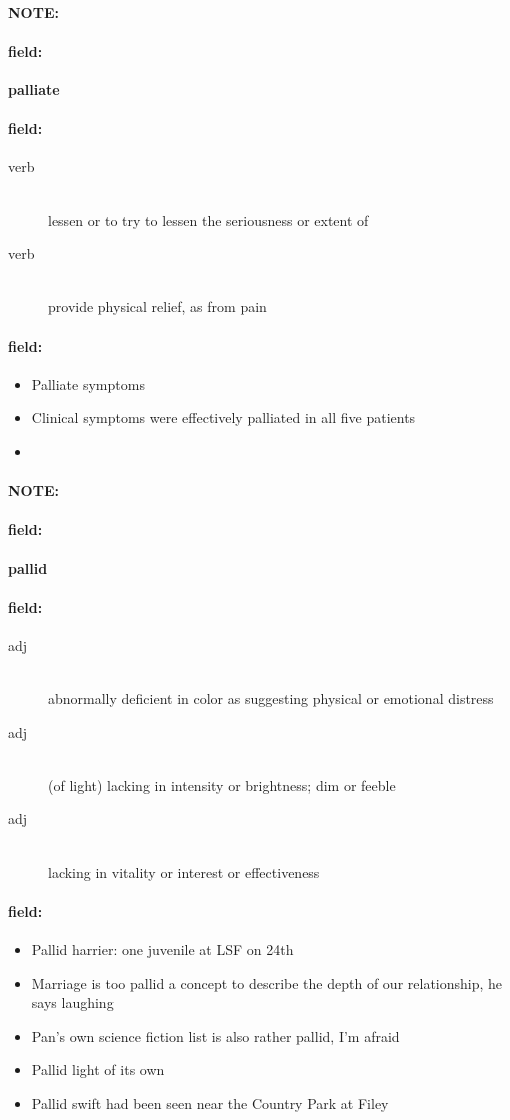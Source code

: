 \documentclass[12pt]{article}
\newenvironment{note}{\paragraph{NOTE:}}{}
\newenvironment{field}{\paragraph{field:}}{}
\begin{document}
\begin{note}
\begin{field}
\textbf{\large palliate}
\end{field}


\begin{field}
\begin{description}
\item[verb] \hfill \\ 
lessen or to try to lessen the seriousness or extent of

\item[verb] \hfill \\ 
provide physical relief, as from pain

\end{description}
\end{field}

\begin{field}
\begin{itemize}
\item Palliate symptoms
\item Clinical symptoms were effectively palliated in all five patients
\item 
\end{itemize}
\end{field}
\end{note}
\begin{note}
\begin{field}
\textbf{\large pallid}
\end{field}


\begin{field}
\begin{description}
\item[adj] \hfill \\ 
abnormally deficient in color as suggesting physical or emotional distress

\item[adj] \hfill \\ 
(of light) lacking in intensity or brightness; dim or feeble

\item[adj] \hfill \\ 
lacking in vitality or interest or effectiveness

\end{description}
\end{field}

\begin{field}
\begin{itemize}
\item Pallid harrier: one juvenile at LSF on 24th
\item Marriage is too pallid a concept to describe the depth of our relationship, he says laughing
\item Pan's own science fiction list is also rather pallid, I'm afraid
\item Pallid light of its own
\item Pallid swift had been seen near the Country Park at Filey
\end{itemize}
\end{field}
\end{note}
\end{document}
